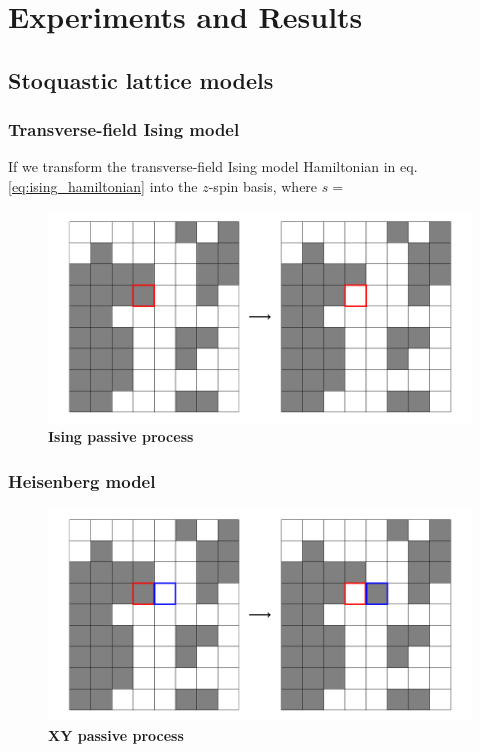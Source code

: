 \ifpdf
\graphicspath{{Chapter5/Figs/Raster/}{Chapter5/Figs/PDF/}{Chapter5/Figs/}}
\else
\graphicspath{{Chapter5/Figs/Vector/}{Chapter5/Figs/}}
\fi


\chapter{Experiments and Results}
\label{chapter5}

\section{Stoquastic lattice models}

\subsection{Transverse-field Ising model}
\label{sec:res-im}
If we transform the transverse-field Ising model Hamiltonian in eq.\eqref{eq:ising_hamiltonian} into the $z$-spin basis, where $s = $
\begin{figure}[h]
	\centering
	\includegraphics[width=0.7\linewidth]{Chapter6/Figs/Vector/ising_passive}
	\caption[Ising passive process]{\textbf{Ising passive process}}	
	\label{fig:isingpassive}
\end{figure}
\subsection{Heisenberg model}
\label{sec:res-hm}
\begin{figure}[h]
	\centering
	\includegraphics[width=0.7\linewidth]{Chapter6/Figs/Vector/xy_passive}
	\caption[XY passive process]{\textbf{XY passive process}}
	\label{fig:xypassive}
\end{figure}

